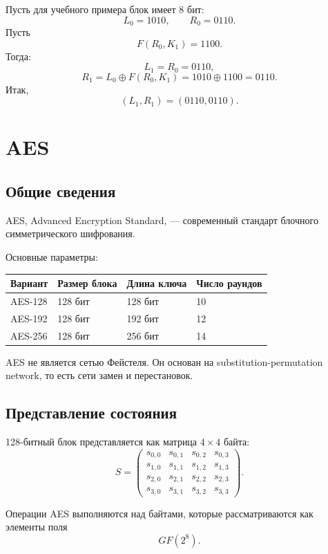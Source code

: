 \documentclass[12pt,a4paper]{article}
\begin{document}
Пусть для учебного примера блок имеет 8 бит:
\[
    L_0=1010,\qquad R_0=0110.
\]
Пусть
\[
    F(R_0,K_1)=1100.
\]
Тогда:
\[
    L_1=R_0=0110,
\]
\[
    R_1=L_0\oplus F(R_0,K_1)=1010\oplus 1100=0110.
\]
Итак,
\[
    (L_1,R_1)=(0110,0110).
\]

\section{AES}

\subsection{Общие сведения}

AES, Advanced Encryption Standard, --- современный стандарт блочного симметрического шифрования.

Основные параметры:

\begin{center}
\begin{tabular}{llll}
\toprule
Вариант & Размер блока & Длина ключа & Число раундов \\
\midrule
AES-128 & 128 бит & 128 бит & 10 \\
AES-192 & 128 бит & 192 бит & 12 \\
AES-256 & 128 бит & 256 бит & 14 \\
\bottomrule
\end{tabular}
\end{center}

AES не является сетью Фейстеля. Он основан на substitution-permutation network, то есть сети замен и перестановок.

\subsection{Представление состояния}

128-битный блок представляется как матрица $4\times 4$ байта:
\[
    S =
    \begin{pmatrix}
    s_{0,0} & s_{0,1} & s_{0,2} & s_{0,3}\\
    s_{1,0} & s_{1,1} & s_{1,2} & s_{1,3}\\
    s_{2,0} & s_{2,1} & s_{2,2} & s_{2,3}\\
    s_{3,0} & s_{3,1} & s_{3,2} & s_{3,3}
    \end{pmatrix}.
\]

Операции AES выполняются над байтами, которые рассматриваются как элементы поля
\[
    GF(2^8).
\]
\end{document}
